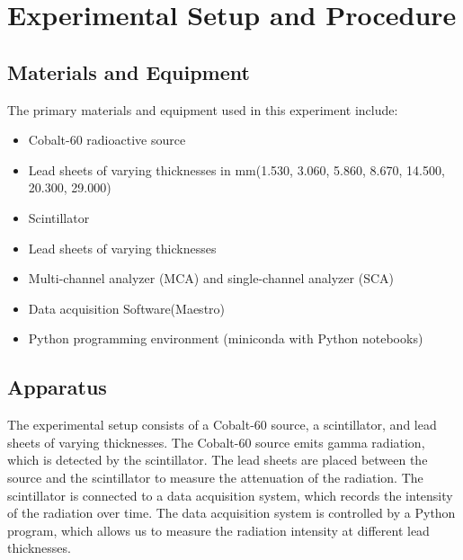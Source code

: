 \documentclass[12pt]{article}
\begin{document}
    \section{Experimental Setup and Procedure}
        \subsection{Materials and Equipment}
            The primary materials and equipment used in this experiment include:
            \begin{itemize}
                \item Cobalt-60 radioactive source
                \item Lead sheets of varying thicknesses in mm(1.530, 3.060, 5.860, 8.670, 14.500, 20.300, 29.000) 
                \item Scintillator
                \item Lead sheets of varying thicknesses
                \item Multi-channel analyzer (MCA) and single-channel analyzer (SCA)
                \item Data acquisition Software(Maestro)
                \item Python programming environment (miniconda with Python notebooks)
            \end{itemize}
            
        \subsection{Apparatus}
            The experimental setup consists of a Cobalt-60 source, a scintillator, and lead sheets of varying thicknesses. 
            The Cobalt-60 source emits gamma radiation, which is detected by the scintillator. 
            The lead sheets are placed between the source and the scintillator to measure the attenuation of the radiation. 
            The scintillator is connected to a data acquisition system, which records the intensity of the radiation over time. 
            The data acquisition system is controlled by a Python program, which allows us to measure the radiation intensity at different lead thicknesses.
            
\end{document}
